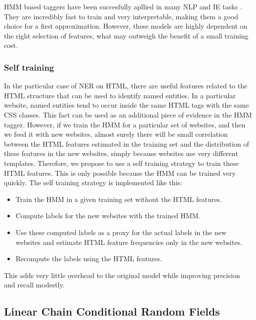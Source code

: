 \documentclass[sigconf]{acmart}
\begin{document}
HMM based taggers have been succesfully apllied in many NLP and IE tasks 
\cite{Rabiner1989, Leek1997, Freitag2000}. They are incredibly fast to train and very 
interpretable, making them a good choice for a first approximation. However, these models 
are highly dependent on the right selection of features, what may outweigh the benefit of a 
small training cost.

\subsubsection{Self training} \label{sssec:self_training}

In the particular case of NER on HTML, there are useful features related to the HTML
structure that can be used to identify named entities. In a particular website, named
entities tend to occur inside the same HTML tags with the same CSS classes. This fact
can be used as an additional piece of evidence in the HMM tagger. However, if we train 
the HMM for a particular set of websites, and then we feed it with new websites, almost 
surely there will be small correlation between the HTML features estimated in the training 
set and the distribution of these features in the new websites, simply because websites 
use very different templates. Therefore, we propose to use a self training strategy to train 
these HTML features. This is only possible because the HMM can be trained very quickly. The 
self training strategy is implemented like this:

\begin{itemize}
\item Train the HMM in a given training set without the HTML features.
\item Compute labels for the new websites with the trained HMM.
\item Use these computed labels as a proxy for the actual labels in the 
new websites and estimate HTML feature frequencies only in the new websites.
\item Recompute the labels using the HTML features.
\end{itemize}

This adds very little overhead to the original model while improving precision and recall
modestly.

\subsection{Linear Chain Conditional Random Fields}
\end{document}
